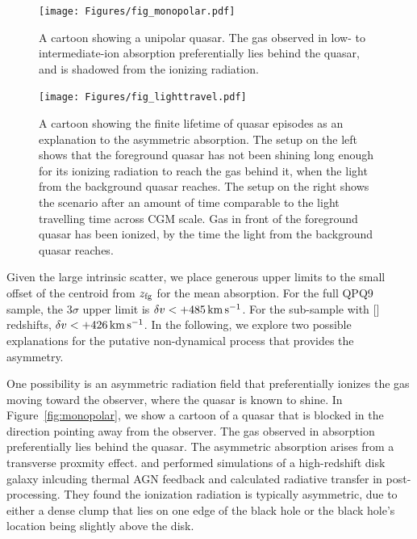 \documentclass[iop]{emulateapj}
\begin{document}
\begin{figure}[!th]
\begin{minipage}[!bp]{0.28\textwidth}
\texttt{[image: Figures/fig\_monopolar.pdf]}
\caption{A cartoon showing a unipolar quasar. The gas observed in low- to intermediate-ion 
absorption preferentially lies behind the quasar, and is shadowed from the ionizing radiation. 
}
\label{fig:monopolar}
\end{minipage}%
\hspace{0.3in}
\begin{minipage}[!bp]{0.67\textwidth}
\texttt{[image: Figures/fig\_lighttravel.pdf]}
\caption{A cartoon showing the finite lifetime of quasar episodes as an explanation to the 
asymmetric absorption. The setup on the left shows that the foreground quasar has not been shining 
long enough for its ionizing radiation to reach the gas behind it, when the light from the 
background quasar reaches. The setup on the right shows the scenario after an amount of time 
comparable to the light travelling time across CGM scale. Gas in front of the foreground quasar 
has been ionized, by the time the light from the background quasar reaches. 
}
\label{fig:lighttravel}
\end{minipage}
\end{figure}

Given the large intrinsic scatter, we place generous upper limits to the small offset of the 
centroid from $z_{\rm fg}$ for the  mean absorption. For the full QPQ9 sample, the 
$3\sigma$ upper limit is $\delta v<+485\,{\rm km\,s^{-1}}$. For the sub-sample with [] 
redshifts, $\delta v<+426\,{\rm km\,s^{-1}}$. In the following, we explore two possible 
explanations for the putative non-dynamical process that provides the asymmetry. 

One possibility is an asymmetric radiation field that preferentially ionizes the gas moving toward 
the observer, where the quasar is known to shine. In Figure~\ref{fig:monopolar}, we show a cartoon 
of a quasar that is blocked in the direction pointing away from the observer. The gas 
observed in absorption preferentially lies behind the quasar. The asymmetric absorption arises 
from a transverse proxmity effect. 
\cite{Roos+15} and \cite{GaborBournaud14} performed simulations of a high-redshift disk galaxy 
inlcuding thermal AGN feedback and calculated radiative transfer in post-processing. They found 
the ionization radiation is typically asymmetric, due to either a dense clump that lies on one 
edge of the black hole or the black hole's location being slightly above the disk. 
\end{document}
